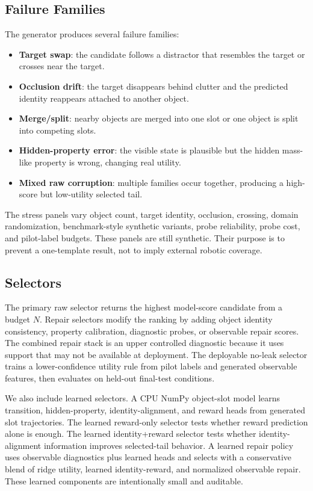 \documentclass[10pt]{article}
\begin{document}
\subsection{Failure Families}

The generator produces several failure families:
\begin{itemize}
  \item \textbf{Target swap}: the candidate follows a distractor that resembles the target or crosses near the target.
  \item \textbf{Occlusion drift}: the target disappears behind clutter and the predicted identity reappears attached to another object.
  \item \textbf{Merge/split}: nearby objects are merged into one slot or one object is split into competing slots.
  \item \textbf{Hidden-property error}: the visible state is plausible but the hidden mass-like property is wrong, changing real utility.
  \item \textbf{Mixed raw corruption}: multiple families occur together, producing a high-score but low-utility selected tail.
\end{itemize}

The stress panels vary object count, target identity, occlusion, crossing, domain randomization, benchmark-style synthetic variants, probe reliability, probe cost, and pilot-label budgets. These panels are still synthetic. Their purpose is to prevent a one-template result, not to imply external robotic coverage.

\subsection{Selectors}

The primary raw selector returns the highest model-score candidate from a budget $N$. Repair selectors modify the ranking by adding object identity consistency, property calibration, diagnostic probes, or observable repair scores. The combined repair stack is an upper controlled diagnostic because it uses support that may not be available at deployment. The deployable no-leak selector trains a lower-confidence utility rule from pilot labels and generated observable features, then evaluates on held-out final-test conditions.

We also include learned selectors. A CPU NumPy object-slot model learns transition, hidden-property, identity-alignment, and reward heads from generated slot trajectories. The learned reward-only selector tests whether reward prediction alone is enough. The learned identity+reward selector tests whether identity-alignment information improves selected-tail behavior. A learned repair policy uses observable diagnostics plus learned heads and selects with a conservative blend of ridge utility, learned identity-reward, and normalized observable repair. These learned components are intentionally small and auditable.
\end{document}
